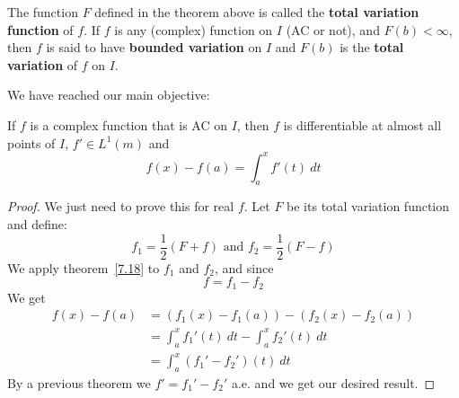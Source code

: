 \begin{definition}
The function $F$ defined in the theorem above is called the \textbf{total variation function} of $f$. If $f$ is any (complex) function on $I$ (AC or not), and $F(b)<\infty$, then $f$ is said to have \textbf{bounded variation} on $I$ and $F(b)$ is the \textbf{total variation} of $f$ on $I$.
\end{definition}

We have reached our main objective:
\begin{theorem}
If $f$ is a complex function that is AC on $I$, then $f$ is differentiable at almost all points of $I$, $f'\in L^1(m)$ and \[
    f(x)-f(a) = \int_a^x f'(t)~dt     
\]
\begin{proof}
    We just need to prove this for real $f$. Let $F$ be its total variation function and define:\[
        f_1 = \frac{1}{2}(F+f) \text{ and }f_2 = \frac{1}{2}(F-f)    
    \]
    We apply theorem~\ref*{7.18} to $f_1$ and $f_2$, and since \[
        f=f_1-f_2    
    \]
    We get \begin{align*}
        f(x)-f(a) &= (f_1(x)-f_1(a)) - (f_2(x)-f_2(a))\\
        &= \int_a^x f_1'(t)~dt -\int_a^x f_2'(t)~dt\\
        &= \int_a^x (f_1'-f_2')(t)~dt  
    \end{align*}
    By a previous theorem we $f' = f_1'-f_2'$ a.e. and we get our desired result.
\end{proof}
\end{theorem}

